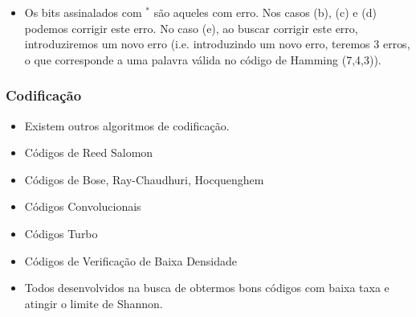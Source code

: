 \begin{frame}[allowframebreaks]
\begin{itemize}
  \item Os bits assinalados com $ ^\ast$ são aqueles com erro. Nos casos (b), (c) e (d) podemos corrigir este erro.
	No caso (e), ao buscar corrigir este erro, introduziremos um novo erro (i.e. introduzindo um novo erro,
	teremos 3 erros, o que corresponde a uma palavra válida no código de Hamming (7,4,3)).
  \end{itemize}
\end{frame}

\begin{frame}[allowframebreaks]
  \frametitle{Codificação}
  \begin{itemize}
  \item Existem outros algoritmos de codificação.
  \item Códigos de Reed Salomon
  \item Códigos de Bose, Ray-Chaudhuri, Hocquenghem
  \item Códigos Convolucionais
  \item Códigos Turbo
  \item Códigos de Verificação de Baixa Densidade
  \item Todos desenvolvidos na busca de obtermos bons códigos com baixa taxa e atingir o limite de Shannon.
  \end{itemize}
\end{frame}




